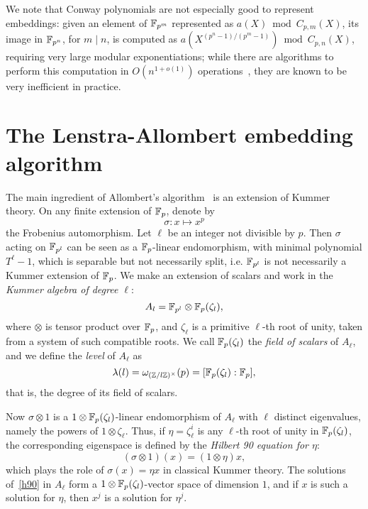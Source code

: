 \documentclass{sig-alternate}
\begin{document}
We note that Conway polynomials are not especially good to represent
embeddings: given an element of $\mathbb{F}_{p^m}$ represented as
$a(X) \bmod C_{p,m}(X)$, its image in $\mathbb{F}_{p^n}$, for $m\mid n$, is
computed as $a(X^{(p^n-1)/(p^m-1)})\bmod C_{p,n}(X)$, requiring very
large modular exponentiations; while there are algorithms to perform
this computation in $O(n^{1+o(1)})$ operations~\cite{KeUm11}, they are
known to be very inefficient in practice. %


\section{The Lenstra-Allombert embedding algorithm}
\label{sec:lenstra}
\cite{LenstraJr91}\cite{brieulle2018computing}


The main ingredient of Allombert's algorithm~\cite{Allombert02} is an extension
of Kummer theory.
On any finite extension of $\mathbb{F}_{p}$, denote by \[ \sigma:x\mapsto x^p \]
the Frobenius automorphism.
Let $\ell$ be an integer not divisible by $p$.
Then $\sigma$ acting on $\mathbb{F}_{p^l}$ can be seen as a $\mathbb{F}_{p}$-linear endomorphism,
with minimal polynomial $T^\ell-1$, which is separable but not necessarily split,
i.e. $\mathbb{F}_{p^l}$ is not necessarily a Kummer extension of $\mathbb{F}_{p}$.
We make an extension of scalars and work in the
\emph{Kummer algebra of degree $\ell$}:
\[
  A_l = \mathbb{F}_{p^l}\otimes\mathbb{F}_{p}(\zeta_l),
\]
where $\otimes$ is tensor product over $\mathbb{F}_{p}$, and $\zeta_\ell$ is a primitive $\ell$-th root of unity, taken from a system of such compatible roots. We
call $\mathbb{F}_{p}(\zeta_l)$ the \emph{field of scalars} of $A_\ell$, and
we define the \emph{level} of $A_\ell$ as
\[
  \lambda(l) = \omega_{(\mathbb{Z}/l\mathbb{Z})^\times}(p) = [\mathbb{F}_{p}(\zeta_l):\mathbb{F}_{p}],
\]
that is, the degree of its field of scalars.

Now $\sigma\otimes1$ is a $1\otimes\mathbb{F}_{p}(\zeta_l)$-linear endomorphism of $A_\ell$
with $\ell$ distinct eigenvalues, namely the powers of $1\otimes\zeta_\ell$.
Thus, if $\eta=\zeta_\ell^i$ is any $\ell$-th root of unity in $\mathbb{F}_{p}(\zeta_l)$,
the corresponding eigenspace is defined by the \emph{Hilbert 90 equation for $\eta$}:
\begin{equation}
  \tag{H90}
 (\sigma\otimes1)(x) = (1\otimes\eta)x,
  \label{h90}
\end{equation}
which plays the role of $\sigma(x)=\eta x$ in classical Kummer theory.
The solutions of~\eqref{h90} in $A_\ell$ form a
$1\otimes\mathbb{F}_{p}(\zeta_{l})$-vector space of dimension $1$,
and if $x$ is such a solution for $\eta$, then $x^j$ is a solution for $\eta^j$.
\end{document}
